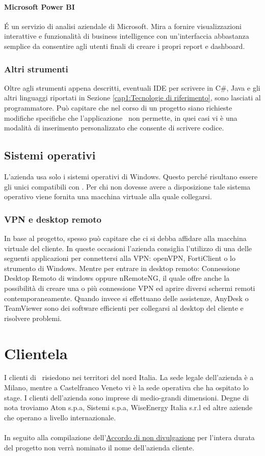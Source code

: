 \paragraph{Microsoft Power BI}
\'E un servizio di analisi aziendale di Microsoft. Mira a fornire visualizzazioni interattive e funzionalità di business intelligence con un'interfaccia abbastanza semplice da consentire agli utenti finali di creare i propri report e dashboard.

\subsubsection*{Altri strumenti}
Oltre agli strumenti appena descritti, eventuali IDE per scrivere in C\#, Java e gli altri linguaggi riportati in Sezione \ref{cap1:Tecnologie di riferimento}, sono lasciati al programmatore. Può capitare che nel corso di un progetto siano richieste  modifiche specifiche che l'applicazione \inde\ non permette, in quei casi vi è una modalità di inserimento personalizzato che consente di scrivere codice.



\subsection{Sistemi operativi}
\label{cap1:Sistemi operativi}

L'azienda usa  solo i sistemi operativi di Windows. Questo perché risultano essere gli unici compatibili con \inde. Per chi non dovesse avere a disposizione tale sistema operativo viene fornita una macchina virtuale alla quale collegarsi. 

\subsubsection*{VPN e desktop remoto}
In base al progetto, spesso può capitare che ci si debba affidare alla macchina virtuale del cliente. In queste occasioni l'azienda consiglia l'utilizzo di una delle seguenti applicazioni per connettersi alla VPN: openVPN, FortiClient o lo strumento di Windows. 
Mentre per entrare in desktop remoto: Connessione Desktop Remoto di windows oppure nRemoteNG, il quale offre anche la possibilità di creare una o più connessione VPN ed aprire diversi schermi remoti contemporaneamente. 
Quando invece si effettuano delle assistenze, AnyDesk o TeamViewer sono dei software efficienti per collegarsi al desktop del cliente e risolvere problemi.


\section{Clientela}
\label{cap1:Clientela}
I clienti di \azienda\ risiedono nei territori del nord Italia. La sede legale dell'azienda è a Milano, mentre a Castelfranco Veneto vi è la sede operativa che ha ospitato lo stage. I clienti dell'azienda sono imprese di medio-grandi dimensioni. Degne di nota troviamo Aton s.p.a, Sistemi s.p.a, WiseEnergy Italia s.r.l ed altre aziende che operano a livello internazionale.

\paragraph*{}In seguito alla compilazione dell'\hyperref[NDA]{Accordo di non divulgazione} per l'intera durata del progetto non verrà nominato il nome dell'azienda cliente.

\newpage